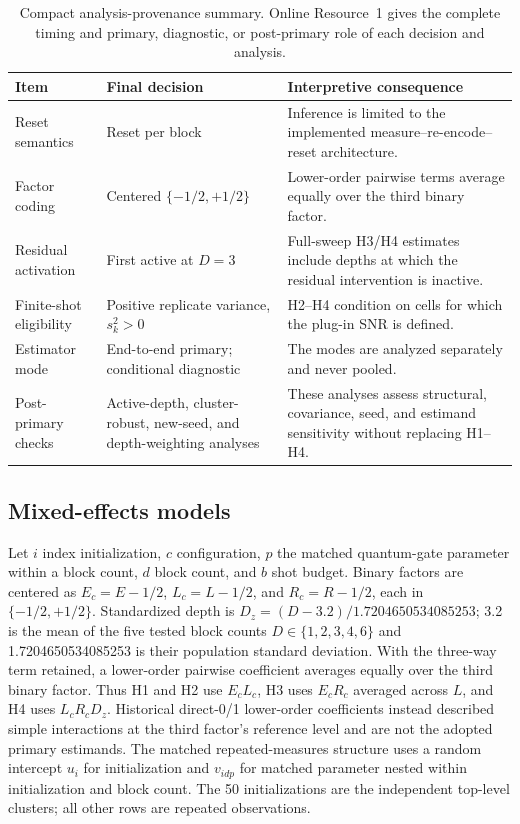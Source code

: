 \documentclass[pdflatex,sn-mathphys-num,Numbered]{sn-jnl}
\begin{document}
\begin{table}[t]
\centering
\small
\begin{tabularx}{\textwidth}{@{}p{}p{}>{\raggedright\arraybackslash}X@{}}
\toprule
Item & Final decision & Interpretive consequence \\
\midrule
Reset semantics & Reset per block & Inference is limited to the implemented measure--re-encode--reset architecture. \\
Factor coding & Centered $\{-1/2,+1/2\}$ & Lower-order pairwise terms average equally over the third binary factor. \\
Residual activation & First active at $D=3$ & Full-sweep H3/H4 estimates include depths at which the residual intervention is inactive. \\
Finite-shot eligibility & Positive replicate variance, $s_k^2>0$ & H2--H4 condition on cells for which the plug-in SNR is defined. \\
Estimator mode & End-to-end primary; conditional diagnostic & The modes are analyzed separately and never pooled. \\
Post-primary checks & Active-depth, cluster-robust, new-seed, and depth-weighting analyses & These analyses assess structural, covariance, seed, and estimand sensitivity without replacing H1--H4. \\
\bottomrule
\end{tabularx}
\caption{Compact analysis-provenance summary. Online Resource~1 gives the complete timing and primary, diagnostic, or post-primary role of each decision and analysis.}
\label{tab:analysis-provenance}
\end{table}

\subsection{Mixed-effects models}

Let $i$ index initialization, $c$ configuration, $p$ the matched quantum-gate parameter within a block count, $d$ block count, and $b$ shot budget. Binary factors are centered as $E_c=E-1/2$, $L_c=L-1/2$, and $R_c=R-1/2$, each in $\{-1/2,+1/2\}$. Standardized depth is $D_z=(D-3.2)/1.7204650534085253$; 3.2 is the mean of the five tested block counts $D\in\{1,2,3,4,6\}$ and 1.7204650534085253 is their population standard deviation. With the three-way term retained, a lower-order pairwise coefficient averages equally over the third binary factor. Thus H1 and H2 use $E_cL_c$, H3 uses $E_cR_c$ averaged across $L$, and H4 uses $L_cR_cD_z$. Historical direct-0/1 lower-order coefficients instead described simple interactions at the third factor's reference level and are not the adopted primary estimands. The matched repeated-measures structure uses a random intercept $u_i$ for initialization and $v_{idp}$ for matched parameter nested within initialization and block count. The 50 initializations are the independent top-level clusters; all other rows are repeated observations.
\end{document}
